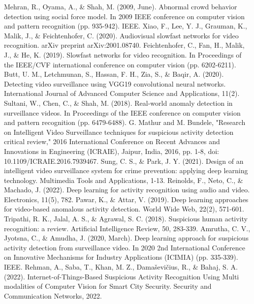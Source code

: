 \documentclass[conference]{IEEEtran}
\begin{document}
\begin{thebibliography}{00}
 Mehran, R., Oyama, A., \& Shah, M. (2009, June). Abnormal crowd behavior detection using social force model. In 2009 IEEE conference on computer vision and pattern recognition (pp. 935-942). IEEE.
 Xiao, F., Lee, Y. J., Grauman, K., Malik, J., \& Feichtenhofer, C. (2020). Audiovisual slowfast networks for video recognition. arXiv preprint arXiv:2001.08740.
 Feichtenhofer, C., Fan, H., Malik, J., \& He, K. (2019). Slowfast networks for video recognition. In Proceedings of the IEEE/CVF international conference on computer vision (pp. 6202-6211).
 Butt, U. M., Letchmunan, S., Hassan, F. H., Zia, S., \& Baqir, A. (2020). Detecting video surveillance using VGG19 convolutional neural networks. International Journal of Advanced Computer Science and Applications, 11(2).
 Sultani, W., Chen, C., \& Shah, M. (2018). Real-world anomaly detection in surveillance videos. In Proceedings of the IEEE conference on computer vision and pattern recognition (pp. 6479-6488).
 G. Mathur and M. Bundele, "Research on Intelligent Video Surveillance techniques for suspicious activity detection critical review," 2016 International Conference on Recent Advances and Innovations in Engineering (ICRAIE), Jaipur, India, 2016, pp. 1-8, doi: 10.1109/ICRAIE.2016.7939467.
 Sung, C. S., \& Park, J. Y. (2021). Design of an intelligent video surveillance system for crime prevention: applying deep learning technology. Multimedia Tools and Applications, 1-13.
 Reinolds, F., Neto, C., \& Machado, J. (2022). Deep learning for activity recognition using audio and video. Electronics, 11(5), 782.
 Pawar, K., \& Attar, V. (2019). Deep learning approaches for video-based anomalous activity detection. World Wide Web, 22(2), 571-601.
 Tripathi, R. K., Jalal, A. S., \& Agrawal, S. C. (2018). Suspicious human activity recognition: a review. Artificial Intelligence Review, 50, 283-339.
 Amrutha, C. V., Jyotsna, C., \& Amudha, J. (2020, March). Deep learning approach for suspicious activity detection from surveillance video. In 2020 2nd International Conference on Innovative Mechanisms for Industry Applications (ICIMIA) (pp. 335-339). IEEE.
 Rehman, A., Saba, T., Khan, M. Z., Damaševičius, R., \& Bahaj, S. A. (2022). Internet-of-Things-Based Suspicious Activity Recognition Using Multi modalities of Computer Vision for Smart City Security. Security and Communication Networks, 2022.
\end{thebibliography}
\end{document}
